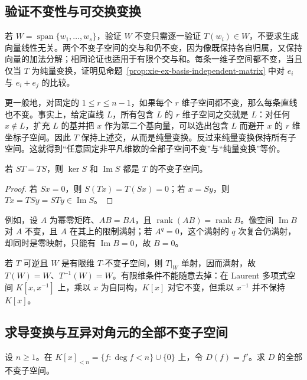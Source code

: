 \subsection{验证不变性与可交换变换}

若 $W=\operatorname{span}\{w_1,\ldots,w_s\}$，验证 $W$ 不变只需逐一验证 $T(w_i)\in W$，不要求生成向量线性无关。两个不变子空间的交与和仍不变，因为像既保持各自归属，又保持向量的加法分解；相同论证也适用于有限个交与和。每条一维子空间都不变，当且仅当 $T$ 为纯量变换，证明见命题~\ref{prop:xie-ex-basis-independent-matrix} 中对 $e_i$ 与 $e_i+e_j$ 的比较。

更一般地，对固定的 $1\leq r\leq n-1$，如果每个 $r$ 维子空间都不变，那么每条直线也不变。事实上，给定直线 $L$，所有包含 $L$ 的 $r$ 维子空间之交就是 $L$：对任何 $x\notin L$，扩充 $L$ 的基并把 $x$ 作为第二个基向量，可以选出包含 $L$ 而避开 $x$ 的 $r$ 维坐标子空间。因此 $T$ 保持上述交，从而是纯量变换。反过来纯量变换保持所有子空间。这就得到“任意固定非平凡维数的全部子空间不变”与“纯量变换”等价。

\begin{proposition}
\label{prop:xie-ex-commuting-invariance}
若 $ST=TS$，则 $\ker S$ 和 $\operatorname{Im}S$ 都是 $T$ 的不变子空间。
\end{proposition}

\begin{proof}
若 $Sx=0$，则 $S(Tx)=T(Sx)=0$；若 $x=Sy$，则 $Tx=TSy=STy\in\operatorname{Im}S$。
\end{proof}

例如，设 $A$ 为幂零矩阵、$AB=BA$，且 $\operatorname{rank}(AB)=\operatorname{rank}B$。像空间 $\operatorname{Im}B$ 对 $A$ 不变，且 $A$ 在其上的限制满射；若 $A^q=0$，这个满射的 $q$ 次复合仍满射，却同时是零映射，只能有 $\operatorname{Im}B=0$，故 $B=0$。

若 $T$ 可逆且 $W$ 是有限维 $T$-不变子空间，则 $T|_W$ 单射，因而满射，故 $T(W)=W$、$T^{-1}(W)=W$。有限维条件不能随意去掉：在 Laurent 多项式空间 $K[x,x^{-1}]$ 上，乘以 $x$ 为自同构，$K[x]$ 对它不变，但乘以 $x^{-1}$ 并不保持 $K[x]$。

\subsection{求导变换与互异对角元的全部不变子空间}

\begin{example}
\label{ex:xie-ex-derivative-invariant}
设 $n\geq1$。在 $K[x]_{<n}=\{f:\deg f<n\}\cup\{0\}$ 上，令 $D(f)=f'$。求 $D$ 的全部不变子空间。
\end{example}

